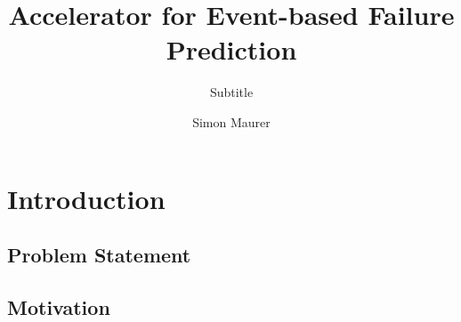 \documentclass[mscthesis]{usiinfthesis}
\title{Accelerator for Event-based Failure Prediction} %
\subtitle{Subtitle} %
\author{Simon Maurer} %
\begin{document}
\maketitle %

\frontmatter %

\begin{abstract}
\end{abstract}

%

\begin{acknowledgements}
\lipsum 
\end{acknowledgements}

\tableofcontents 
\listoffigures %
\listoftables %

\mainmatter

\chapter{Introduction}
\section{Problem Statement}
\section{Motivation}
\end{document}
